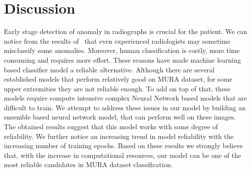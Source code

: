 \documentclass{article}
\begin{document}
\section{Discussion}
Early stage detection of anomaly in radiographs is crucial for the patient. We can notice from the results of~\cite{pranav_18} that even experienced radiologists may sometime misclassify some anomalies. Moreover, human classification is costly, more time consuming and requires more effort. These reasons have made machine learning based classifier model a reliable alternative. Although there are several established models that perform relatively good on MURA dataset, for some upper extremities they are not reliable enough. To add on top of that, these models require compute intensive complex Neural Network based models that are difficult to train. We attempt to address these issues in our model by building an ensemble based neural network model, that can perform well on these images. The obtained results suggest that this model works with some degree of reliability. We further notice an increasing trend in model reliability with the increasing number of training epochs. Based on these results we strongly believe that, with the increase in computational resources, our model can be one of the most reliable candidates in MURA dataset classification.





\end{document}
